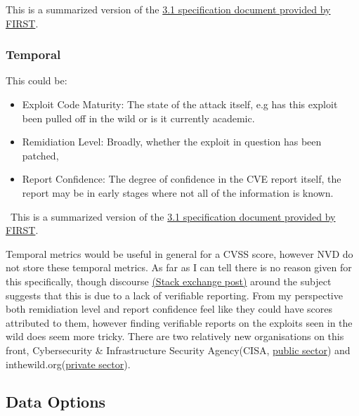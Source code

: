 \documentclass[12pt]{article}
\begin{document}
\footnotesize{This is a summarized version of the
	\href{https://www.first.org/cvss/v3.1/specification-document}{3.1 specification document
		provided by FIRST}.\cite{CVSS_31}}


\subsubsection*{Temporal}


\bigskip

This could be:
\begin{itemize}

	\item Exploit Code Maturity: The state of the attack itself, e.g has this exploit been pulled off in the wild or is it currently academic.

	\item Remidiation Level: Broadly, whether the exploit in question has been patched,

	\item Report Confidence: The degree of confidence in the CVE report itself, the report may be in early stages where not all of the
	      information is known.

\end{itemize}
\
\footnotesize{This is a summarized version of the
	\href{https://www.first.org/cvss/v3.1/specification-document}{3.1 specification document
		provided by FIRST}.\cite{CVSS_31}} \\
\bigskip

Temporal metrics would be useful in general for a CVSS score, however NVD do not store these
temporal metrics. As far as I can tell there is no reason given for this specifically, though
discourse
\href{https://security.stackexchange.com/questions/270257/cvss-v3-and-v3-1-missing-temporal-metrics-exploit-code-maturity-and-remediation
}{(Stack exchange post)}\cite{stack_exchange} around the subject suggests that this is due to a lack
of verifiable reporting. From my perspective both remidiation level and report confidence feel like
they could have scores attributed to them, however finding verifiable reports on the exploits seen
in the wild does seem more tricky. There are two relatively new organisations on this front,
Cybersecurity \& Infrastructure Security Agency(CISA,
\href{https://www.cisa.gov/known-exploited-vulnerabilities-catalog}{public sector}) and
inthewild.org(\href{https://inthewild.io/}{private sector}\cite{cisa}).

\subsection{Data Options}
\end{document}
